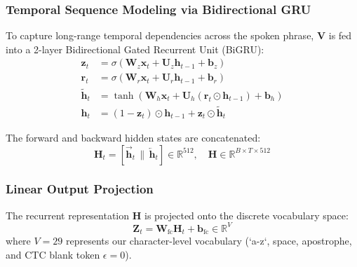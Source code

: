 \documentclass[conference,compsoc,10pt]{IEEEtran}
\begin{document}
\subsubsection{Temporal Sequence Modeling via Bidirectional GRU}
To capture long-range temporal dependencies across the spoken phrase, $\mathbf{V}$ is fed into a 2-layer Bidirectional Gated Recurrent Unit (BiGRU):
\begin{align}
\mathbf{z}_t &= \sigma\left( \mathbf{W}_z \mathbf{x}_t + \mathbf{U}_z \mathbf{h}_{t-1} + \mathbf{b}_z \right) \\
\mathbf{r}_t &= \sigma\left( \mathbf{W}_r \mathbf{x}_t + \mathbf{U}_r \mathbf{h}_{t-1} + \mathbf{b}_r \right) \\
\widetilde{\mathbf{h}}_t &= \tanh\left( \mathbf{W}_h \mathbf{x}_t + \mathbf{U}_h (\mathbf{r}_t \odot \mathbf{h}_{t-1}) + \mathbf{b}_h \right) \\
\mathbf{h}_t &= (1 - \mathbf{z}_t) \odot \mathbf{h}_{t-1} + \mathbf{z}_t \odot \widetilde{\mathbf{h}}_t
\end{align}

The forward and backward hidden states are concatenated:
\begin{equation}
\mathbf{H}_t = \left[ \overrightarrow{\mathbf{h}}_t \,\|\, \overleftarrow{\mathbf{h}}_t \right] \in \mathbb{R}^{512}, \quad \mathbf{H} \in \mathbb{R}^{B \times T \times 512}
\end{equation}

\subsubsection{Linear Output Projection}
The recurrent representation $\mathbf{H}$ is projected onto the discrete vocabulary space:
\begin{equation}
\mathbf{Z}_t = \mathbf{W}_{\text{fc}} \mathbf{H}_t + \mathbf{b}_{\text{fc}} \in \mathbb{R}^{V}
\end{equation}
where $V = 29$ represents our character-level vocabulary (`a-z`, space, apostrophe, and CTC blank token $\epsilon = 0$).
\end{document}
